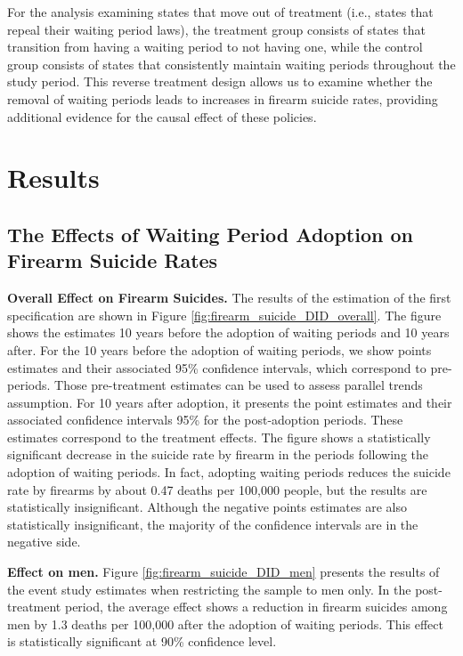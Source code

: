 For the analysis examining states that move out of treatment (i.e., states that repeal their waiting period laws), the treatment group consists of states that transition from having a waiting period to not having one, while the control group consists of states that consistently maintain waiting periods throughout the study period. This reverse treatment design allows us to examine whether the removal of waiting periods leads to increases in firearm suicide rates, providing additional evidence for the causal effect of these policies.

\section{Results} \label{sec:results} 

\subsection*{The Effects of Waiting Period Adoption on Firearm Suicide Rates}

\textbf{Overall Effect on Firearm Suicides.} The results of the estimation of the first specification are shown in Figure \ref{fig:firearm_suicide_DID_overall}. The figure shows the estimates 10 years before the adoption of waiting periods and 10 years after. For the 10 years before the adoption of waiting periods, we show points estimates and their associated 95\% confidence intervals, which correspond to pre-periods. Those pre-treatment estimates can be used to assess parallel trends assumption. For 10 years after adoption, it presents the point estimates and their associated confidence intervals 95\% for the post-adoption periods. These estimates correspond to the treatment effects. The figure shows a statistically significant decrease in the suicide rate by firearm in the periods following the adoption of waiting periods. In fact, adopting waiting periods reduces the suicide rate by firearms by about 0.47 deaths per 100,000 people, but the results are statistically insignificant. Although the negative points estimates are also statistically insignificant, the majority of the confidence intervals are in the negative side. 

\textbf{Effect on men.} Figure \ref{fig:firearm_suicide_DID_men} presents the results of the event study estimates when restricting the sample to men only. In the post-treatment period, the average effect shows a reduction in firearm suicides among men by 1.3 deaths per 100,000 after the adoption of waiting periods. This effect is statistically significant at 90\% confidence level. 

